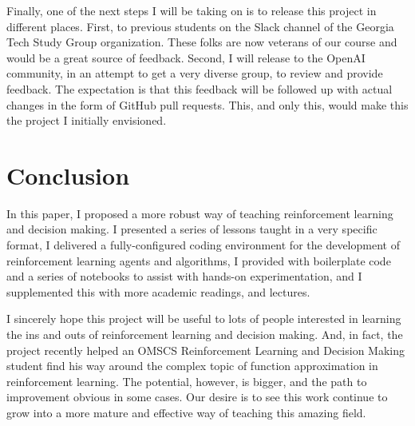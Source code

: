 \documentclass[11pt]{article} %
\begin{document}
Finally, one of the next steps I will be taking on is to release this project
in different places. First, to previous students on the Slack channel of the
Georgia Tech Study Group organization. These folks are now veterans of our course
and would be a great source of feedback. Second, I will release to the OpenAI
community, in an attempt to get a very diverse group, to review and provide 
feedback. The expectation is that this feedback will be followed up with
actual changes in the form of GitHub pull requests. This, and only this, would
make this the project I initially envisioned. 

\section{Conclusion}

In this paper, I proposed a more robust way of teaching reinforcement learning
and decision making. I presented a series of lessons taught in a very specific
format, I delivered a fully-configured coding environment for the development
of reinforcement learning agents and algorithms, I provided with boilerplate
code and a series of notebooks to assist with hands-on experimentation, and I
supplemented this with more academic readings, and lectures.

I sincerely hope this project will be useful to lots of people interested in
learning the ins and outs of reinforcement learning and decision making. And,
in fact, the project recently helped an OMSCS Reinforcement Learning and
Decision Making student find his way around the complex topic of function
approximation in reinforcement learning. The potential, however, is bigger, and
the path to improvement obvious in some cases. Our desire is to see this
work continue to grow into a more mature and effective way of teaching this
amazing field.

\medskip
 
\end{document}
